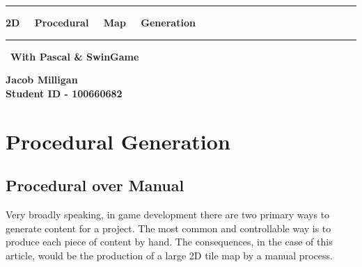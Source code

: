 \documentclass{article}
\begin{document}
\begin{titlepage}

\centering
\vspace*{0.3cm}

\Huge
\begin{mdframed}[backgroundcolor=lightgray,linecolor=lightgray]
\centering
\vspace{7mm}
\rule{\textwidth}{2mm}

\textbf{2D \ \ Procedural \ \ Map \ \ Generation} 

\vspace{3mm}

\rule{\textwidth}{2mm}
\huge
\vfill
\
\textbf{With Pascal \& SwinGame}
\vspace{7mm}
\end{mdframed}

\vfill


\vfill
\large
\textbf{Jacob Milligan \\ \small Student ID - 100660682}

\end{titlepage}

\clearpage

\tableofcontents

\clearpage

\section{Procedural Generation}

\subsection{Procedural over Manual}


Very broadly speaking, in game development there are two primary ways to generate content for a project. The most common and controllable way is to produce each piece of content by hand. The consequences, in the case of this article, would be the production of a large 2D tile map by a manual process.
		
\end{document}
